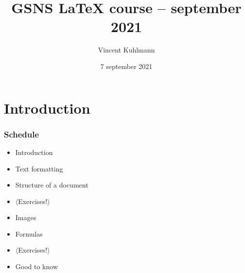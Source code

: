 

\title{GSNS \LaTeX{} course -- september 2021}
\author{Vincent Kuhlmann}
\date{7 september 2021}



\section{Introduction}

\begin{frame}
	\titlepage
	\centering
\end{frame}


\begin{frame}
	\frametitle{Schedule}
	
	\begin{itemize}
		\item Introduction
		\item Text formatting
		\item Structure of a document
		\item $ \langle $Exercises!$ \rangle $
		\item Images
		\item Formulas
		\item $ \mathbf\langle $Exercises!$ \rangle $
		\item Good to know
	\end{itemize}
\end{frame}















%


